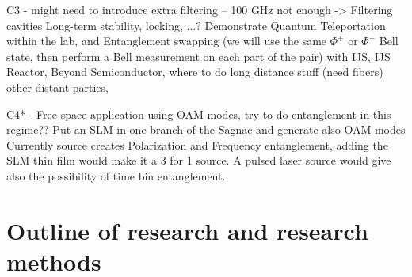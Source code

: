 \documentclass{article}
\theoremstyle{mytheoremstyle}
\theoremstyle{mytheoremstyle}
\theoremstyle{myproblemstyle}
\begin{document}


C3 - might need to introduce extra filtering -- 100 GHz not enough -> Filtering cavities
Long-term stability, locking, ...? Demonstrate Quantum Teleportation within the lab, and Entanglement swapping (we will use the same $\Phi^+$ or $\Phi^-$ Bell state,
then perform a Bell measurement on each part of the pair) with IJS, IJS Reactor, Beyond Semiconductor, where to do
long distance stuff (need fibers) other distant parties,

C4* - Free space application using OAM modes, try to do entanglement in this regime??
Put an SLM in one branch of the Sagnac and generate also OAM modes
Currently source creates Polarization and Frequency entanglement, adding the SLM thin film would make it a 3 for 1 source. A pulsed laser source would give
also the possibility of time bin entanglement.


\section{Outline of research and research methods}
\end{document}
